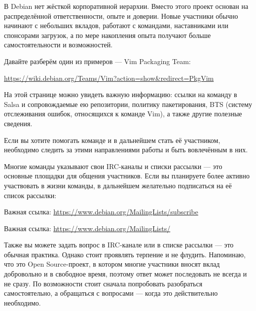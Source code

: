 В Debian нет жёсткой корпоративной иерархии. Вместо этого проект основан на
распределённой ответственности, опыте и доверии. Новые участники обычно начинают
с небольших вкладов, работают с командами, наставниками или спонсорами загрузок,
а по мере накопления опыта получают больше самостоятельности и возможностей.

Давайте разберём один из примеров --- Vim Packaging Team:

\url{https://wiki.debian.org/Teams/Vim?action=show&redirect=PkgVim}

На этой странице можно увидеть важную информацию: ссылки на команду в Salsa и
сопровождаемые ею репозитории, политику пакетирования, BTS (систему отслеживания
ошибок, относящихся к команде Vim), а также другие полезные сведения.

Если вы хотите помогать команде и в дальнейшем стать её участником, необходимо
следить за этими направлениями работы и быть вовлечённым в них.

Многие команды указывают свои IRC-каналы и списки рассылки --- это основные
площадки для общения участников. Если вы планируете более активно участвовать в
жизни команды, в дальнейшем желательно подписаться на её список рассылки:

Важная ссылка: \url{https://www.debian.org/MailingLists/subscribe}

Важная ссылка: \url{https://www.debian.org/MailingLists/}

Также вы можете задать вопрос в IRC-канале или в списке рассылки --- это обычная
практика. Однако стоит проявлять терпение и не флудить. Напоминаю, что это Open
Source-проект, в котором многие участники вносят вклад добровольно и в свободное
время, поэтому ответ может последовать не всегда и не сразу. По возможности
стоит сначала попробовать разобраться самостоятельно, а обращаться с вопросами
--- когда это действительно необходимо.

\vspace{10cm}
